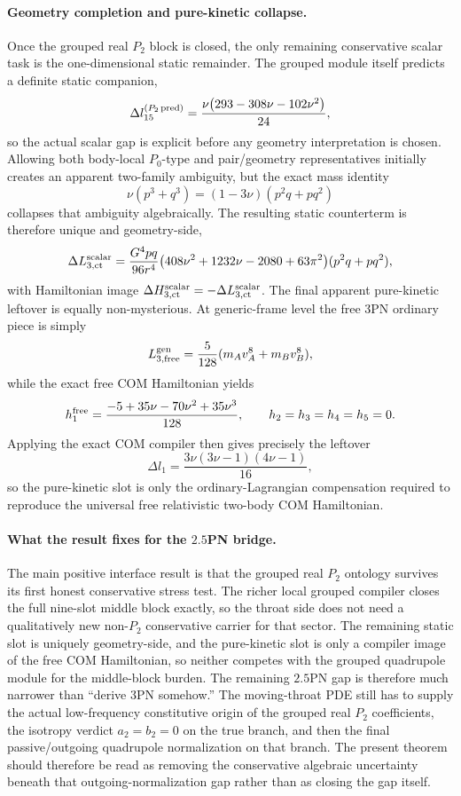 \documentclass[11pt]{article}
\begin{document}
\paragraph{Geometry completion and pure-kinetic collapse.}
Once the grouped real $P_2$ block is closed, the only remaining conservative
scalar task is the one-dimensional static remainder.  The grouped module itself
predicts a definite static companion,
\[
\Delta l_{15}^{(P_2\,\rm pred)}
=
\frac{\nu\bigl(293-308\nu-102\nu^2\bigr)}{24},
\]
so the actual scalar gap is explicit before any geometry interpretation is chosen.
Allowing both body-local $P_0$-type and pair/geometry representatives initially
creates an apparent two-family ambiguity, but the exact mass identity
\[
\nu(p^3+q^3)=(1-3\nu)(p^2q+pq^2)
\]
collapses that ambiguity algebraically.  The resulting static counterterm is
therefore unique and geometry-side,
\[
\Delta L_{3,\rm ct}^{\rm scalar}
=
\frac{G^4pq}{96r^4}
\bigl(408\nu^2+1232\nu-2080+63\pi^2\bigr)(p^2q+pq^2),
\]
with Hamiltonian image $\Delta H_{3,\rm ct}^{\rm scalar}=-\Delta L_{3,\rm ct}^{\rm scalar}$.
The final apparent pure-kinetic leftover is equally non-mysterious.  At
generic-frame level the free $3$PN ordinary piece is simply
\[
L_{3,\rm free}^{\rm gen}=\frac{5}{128}(m_Av_A^8+m_Bv_B^8),
\]
while the exact free COM Hamiltonian yields
\[
h_1^{\rm free}=\frac{-5+35\nu-70\nu^2+35\nu^3}{128},
\qquad h_2=h_3=h_4=h_5=0.
\]
Applying the exact COM compiler then gives precisely the leftover
\[
\Delta l_1=\frac{3\nu(3\nu-1)(4\nu-1)}{16},
\]
so the pure-kinetic slot is only the ordinary-Lagrangian compensation required to
reproduce the universal free relativistic two-body COM Hamiltonian.

\paragraph{What the result fixes for the \texorpdfstring{$2.5$}{2.5}PN bridge.}
The main positive interface result is that the grouped real $P_2$ ontology
survives its first honest conservative stress test.  The richer local grouped
compiler closes the full nine-slot middle block exactly, so the throat side does
not need a qualitatively new non-$P_2$ conservative carrier for that sector.  The
remaining static slot is uniquely geometry-side, and the pure-kinetic slot is
only a compiler image of the free COM Hamiltonian, so neither competes with the
grouped quadrupole module for the middle-block burden.  The remaining $2.5$PN
gap is therefore much narrower than ``derive $3$PN somehow.''  The moving-throat
PDE still has to supply the actual low-frequency constitutive origin of the
grouped real $P_2$ coefficients, the isotropy verdict $a_2=b_2=0$ on the true
branch, and then the final passive/outgoing quadrupole normalization on that
branch.  The present theorem should therefore be read as removing the
conservative algebraic uncertainty beneath that outgoing-normalization gap rather
than as closing the gap itself.
\end{document}
